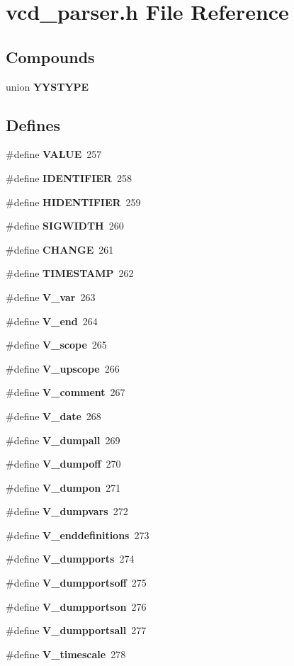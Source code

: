\section{vcd\_\-parser.h File Reference}
\label{vcd__parser_8h}
\subsection*{Compounds}
\begin{CompactItemize}
\item 
union {\bf YYSTYPE}
\end{CompactItemize}
\subsection*{Defines}
\begin{CompactItemize}
\item 
\#define {\bf VALUE}\ 257
\item 
\#define {\bf IDENTIFIER}\ 258
\item 
\#define {\bf HIDENTIFIER}\ 259
\item 
\#define {\bf SIGWIDTH}\ 260
\item 
\#define {\bf CHANGE}\ 261
\item 
\#define {\bf TIMESTAMP}\ 262
\item 
\#define {\bf V\_\-var}\ 263
\item 
\#define {\bf V\_\-end}\ 264
\item 
\#define {\bf V\_\-scope}\ 265
\item 
\#define {\bf V\_\-upscope}\ 266
\item 
\#define {\bf V\_\-comment}\ 267
\item 
\#define {\bf V\_\-date}\ 268
\item 
\#define {\bf V\_\-dumpall}\ 269
\item 
\#define {\bf V\_\-dumpoff}\ 270
\item 
\#define {\bf V\_\-dumpon}\ 271
\item 
\#define {\bf V\_\-dumpvars}\ 272
\item 
\#define {\bf V\_\-enddefinitions}\ 273
\item 
\#define {\bf V\_\-dumpports}\ 274
\item 
\#define {\bf V\_\-dumpportsoff}\ 275
\item 
\#define {\bf V\_\-dumpportson}\ 276
\item 
\#define {\bf V\_\-dumpportsall}\ 277
\item 
\#define {\bf V\_\-timescale}\ 278

\end{CompactItemize}
